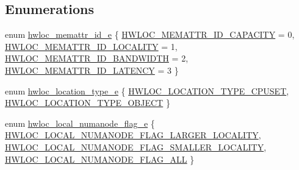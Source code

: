 \subsection*{Enumerations}
\begin{DoxyCompactItemize}
\item 
enum \hyperlink{a00211_gab4bde745db676fc2ea4b47011cd9a80e}{hwloc\+\_\+memattr\+\_\+id\+\_\+e} \{ \hyperlink{a00211_ggab4bde745db676fc2ea4b47011cd9a80eaa1cfa3ff3d56ff00ecabf7da4f5642cc}{H\+W\+L\+O\+C\+\_\+\+M\+E\+M\+A\+T\+T\+R\+\_\+\+I\+D\+\_\+\+C\+A\+P\+A\+C\+I\+TY} = 0, 
\hyperlink{a00211_ggab4bde745db676fc2ea4b47011cd9a80ea9334e3a4c30a67f491c6523255134efe}{H\+W\+L\+O\+C\+\_\+\+M\+E\+M\+A\+T\+T\+R\+\_\+\+I\+D\+\_\+\+L\+O\+C\+A\+L\+I\+TY} = 1, 
\hyperlink{a00211_ggab4bde745db676fc2ea4b47011cd9a80ea25fe3c7376ae6f9b584bacdb039f8c0f}{H\+W\+L\+O\+C\+\_\+\+M\+E\+M\+A\+T\+T\+R\+\_\+\+I\+D\+\_\+\+B\+A\+N\+D\+W\+I\+D\+TH} = 2, 
\hyperlink{a00211_ggab4bde745db676fc2ea4b47011cd9a80ead1796413759b8b87b61ad195a9349b19}{H\+W\+L\+O\+C\+\_\+\+M\+E\+M\+A\+T\+T\+R\+\_\+\+I\+D\+\_\+\+L\+A\+T\+E\+N\+CY} = 3
 \}
\item 
enum \hyperlink{a00211_ga33099ba58f607fc70925da3777688586}{hwloc\+\_\+location\+\_\+type\+\_\+e} \{ \hyperlink{a00211_gga33099ba58f607fc70925da3777688586a7135318a86361ad75fd1648e6bf6d174}{H\+W\+L\+O\+C\+\_\+\+L\+O\+C\+A\+T\+I\+O\+N\+\_\+\+T\+Y\+P\+E\+\_\+\+C\+P\+U\+S\+ET}, 
\hyperlink{a00211_gga33099ba58f607fc70925da3777688586af637c39b23d48cff15ddb008644aaa84}{H\+W\+L\+O\+C\+\_\+\+L\+O\+C\+A\+T\+I\+O\+N\+\_\+\+T\+Y\+P\+E\+\_\+\+O\+B\+J\+E\+CT}
 \}
\item 
enum \hyperlink{a00211_gab9c963ca37255da71b00d94e1b106f9d}{hwloc\+\_\+local\+\_\+numanode\+\_\+flag\+\_\+e} \{ \hyperlink{a00211_ggab9c963ca37255da71b00d94e1b106f9da200c6c133bb2125ba36d77ce9ca268cc}{H\+W\+L\+O\+C\+\_\+\+L\+O\+C\+A\+L\+\_\+\+N\+U\+M\+A\+N\+O\+D\+E\+\_\+\+F\+L\+A\+G\+\_\+\+L\+A\+R\+G\+E\+R\+\_\+\+L\+O\+C\+A\+L\+I\+TY}, 
\hyperlink{a00211_ggab9c963ca37255da71b00d94e1b106f9daac9c5e3a2cfb1b193e4acfceaf3bad57}{H\+W\+L\+O\+C\+\_\+\+L\+O\+C\+A\+L\+\_\+\+N\+U\+M\+A\+N\+O\+D\+E\+\_\+\+F\+L\+A\+G\+\_\+\+S\+M\+A\+L\+L\+E\+R\+\_\+\+L\+O\+C\+A\+L\+I\+TY}, 
\hyperlink{a00211_ggab9c963ca37255da71b00d94e1b106f9dab5778b34c961a5d56f98f1549edeaed0}{H\+W\+L\+O\+C\+\_\+\+L\+O\+C\+A\+L\+\_\+\+N\+U\+M\+A\+N\+O\+D\+E\+\_\+\+F\+L\+A\+G\+\_\+\+A\+LL}
 \}
\end{DoxyCompactItemize}
